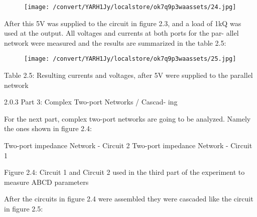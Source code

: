\documentclass[12pt]{report}
\begin{document}
\vspace{10pt}

\begin{figure}[h]

\texttt{[image: /convert/YARH1Jy/localstore/ok7q9p3waassets/24.jpg]}

\centering

\end{figure}

\par

\vspace{10pt}

    After this 5V was supplied to the circuit in figure 2.3, and a load of 1kQ  was used at the output. All voltages and currents at both ports for the par-  allel network were measured and the results are summarized in the table 2.5: 

\vspace{10pt}

\begin{figure}[h]

\texttt{[image: /convert/YARH1Jy/localstore/ok7q9p3waassets/25.jpg]}

\centering

\end{figure}

    Table 2.5: Resulting currents and voltages, after 5V were supplied to the  parallel network 

\vspace{10pt}

    2.0.3 Part 3: Complex Two-port Networks / Cascad-  ing 

\vspace{10pt}

    For the next part, complex two-port networks are going to be analyzed.  Namely the ones shown in figure 2.4: 

\vspace{10pt}

              Two-port impedance Network - Circuit 2    Two-port impedance Network - Circuit 1          

\vspace{10pt}

    Figure 2.4: Circuit 1 and Circuit 2 used in the third part of the experiment  to measure ABCD parameters 

\vspace{10pt}

    After the circuits in figure 2.4 were assembled they were cascaded like the  circuit in figure 2.5: 
\end{document}
